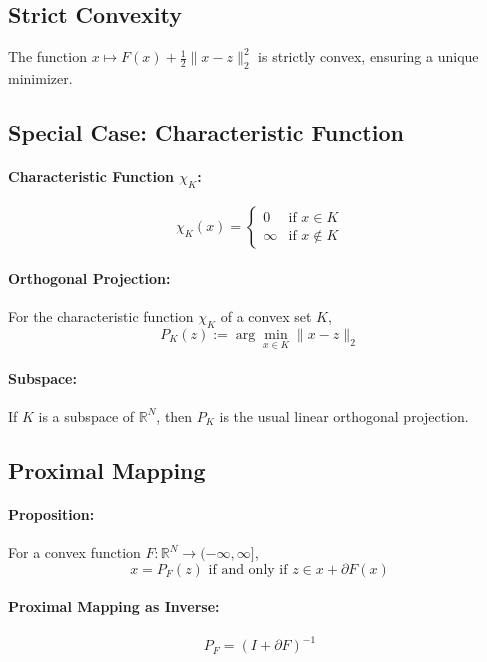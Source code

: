 \documentclass{article}
\begin{document}
\subsection*{Strict Convexity}
The function $x \mapsto F(x) + \frac{1}{2} \| x - z \|_2^2$ is strictly convex, ensuring a unique minimizer.

\subsection*{Special Case: Characteristic Function}

\paragraph{Characteristic Function $\chi_K$:}
\[
\chi_K(x) = \begin{cases} 
0 & \text{if } x \in K \\ 
\infty & \text{if } x \notin K 
\end{cases}
\]

\paragraph{Orthogonal Projection:}
For the characteristic function $\chi_K$ of a convex set $K$,
\[
P_K(z) := \arg \min_{x \in K} \| x - z \|_2
\]

\paragraph{Subspace:}
If $K$ is a subspace of $\mathbb{R}^N$, then $P_K$ is the usual linear orthogonal projection.

\subsection*{Proximal Mapping}

\paragraph{Proposition:}
For a convex function $F : \mathbb{R}^N \rightarrow (-\infty,\infty]$,
\[
x = P_F(z) \text{ if and only if } z \in x + \partial F(x)
\]

\paragraph{Proximal Mapping as Inverse:}
\[
P_F = (I + \partial F)^{-1}
\]
\end{document}

